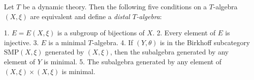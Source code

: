 Let $T$ be a dynamic theory. Then the following five conditions on a $T$-algebra $(X, \xi)$ are equivalent and define a \textit{distal $T$-algebra}:

1. $E = E(X, \xi)$ is a subgroup of bijections of $X$.
2. Every element of $E$ is injective.
3. $E$ is a minimal $T$-algebra.
4. If $(Y, \theta)$ is in the Birkhoff subcategory $\mathrm{SMP}(X, \xi)$ generated by $(X, \xi)$, then the subalgebra generated by any element of $Y$ is minimal.
5. The subalgebra generated by any element of $(X, \xi) \times (X, \xi)$ is minimal.
